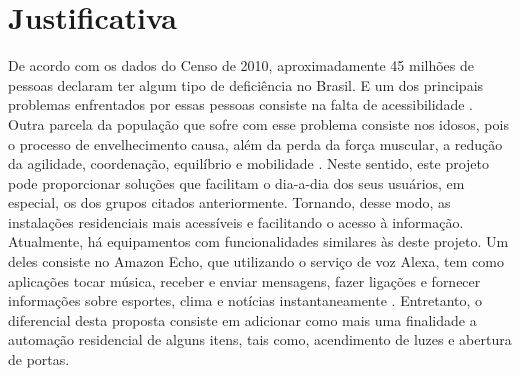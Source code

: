 \section{Justificativa}

  De acordo com os dados do Censo de 2010, aproximadamente 45 milhões de pessoas declaram ter algum tipo de deficiência no Brasil. E um dos principais problemas enfrentados por essas pessoas consiste na falta de acessibilidade \cite{dadosIBGE}.
  Outra parcela da população que sofre com esse problema consiste nos idosos, pois o processo de envelhecimento causa, além da perda da força muscular, a redução da agilidade, coordenação, equilíbrio e mobilidade \cite{idosos}.
  Neste sentido, este projeto pode proporcionar soluções que facilitam o dia-a-dia dos seus usuários, em especial, os dos grupos citados anteriormente. Tornando, desse modo, as instalações residenciais mais acessíveis e facilitando o acesso à informação.
  Atualmente, há equipamentos com funcionalidades similares às deste projeto. Um deles consiste no Amazon Echo, que utilizando o serviço de voz Alexa, tem como aplicações tocar música, receber e enviar mensagens, fazer ligações e fornecer informações sobre esportes, clima e notícias instantaneamente \cite{echo}. Entretanto, o diferencial desta proposta consiste em adicionar como mais uma finalidade a automação residencial de alguns itens, tais como, acendimento de luzes e abertura de portas.

